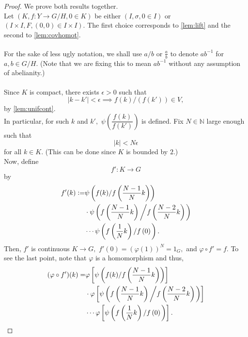 \documentclass[12pt]{article}
\theoremstyle{definition}
\numberwithin{thm}{section}
\begin{document}
\begin{proof} 
 	We prove both results together.\\
 	Let $(K, f:Y\to G/H, 0 \in K)$ be either $(I, \sigma, 0 \in I)$ or $(I \times I, F, (0, 0) \in I \times I).$ The first choice corresponds to \cref{lem:lift} and the second to \cref{lem:covhomot}. \\~\\
 	For the sake of less ugly notation, we shall use $a/b$ or $\frac{a}{b}$ to denote $ab^{-1}$ for $a, b \in G/H.$ (Note that we are fixing this to mean $ab^{-1}$ without any assumption of abelianity.)\\~\\
 	Since $K$ is compact, there exists $\epsilon > 0$ such that 
 	\begin{equation*} 
 		|k - k'| < \epsilon \implies f(k)/(f(k')) \in V,
 	\end{equation*} by \cref{lem:unifcont}.\\
 	In particular, for such $k$ and $k',$ $\psi\left(\dfrac{f(k)}{f(k')}\right)$ is defined. Fix $N \in \mathbb{N}$ large enough such that
 	\begin{equation*} 
 		|k| < N\epsilon
 	\end{equation*}
 	for all $k \in K.$ (This can be done since $K$ is bounded by $2$.)\\
 	Now, define
 	\begin{equation*} 
 		f':K \to G
 	\end{equation*}
 	by
 	\begin{align*} 
 		f'(k) \vcentcolon= &\psi\left(f(k)/f\left(\dfrac{N-1}{N}k\right)\right)\\
 		& \cdot \psi\left(f\left(\dfrac{N-1}{N}k\right)\left/f\left(\dfrac{N-2}{N}k\right)\right.\right)\\
 		& \cdots \psi\left(f\left(\dfrac{1}{N}k\right)\left/f\left(0\right)\right.\right).
 	\end{align*}
 	Then, $f'$ is continuous $K \to G,$ $f'(0) = (\varphi(1))^N = 1_G,$ and $\varphi\circ f' = f.$ To see the last point, note that $\varphi$ is a homomorphism and thus,
 	\begin{align*} 
 		(\varphi\circ f')(k) = &\varphi\left[\psi\left(f(k)/f\left(\dfrac{N-1}{N}k\right)\right)\right]\\
 		& \cdot \varphi\left[\psi\left(f\left(\dfrac{N-1}{N}k\right)\left/f\left(\dfrac{N-2}{N}k\right)\right.\right)\right]\\
 		& \cdots \varphi\left[\psi\left(f\left(\dfrac{1}{N}k\right)\left/f\left(0\right)\right.\right)\right].

\end{align*}
\end{proof}
\end{document}
